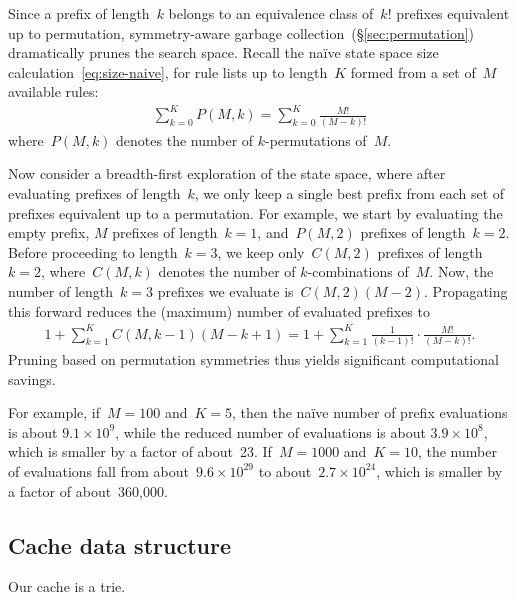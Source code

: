 Since a prefix of length~$k$ belongs to an equivalence class of~$k!$ prefixes
equivalent up to permutation, symmetry-aware garbage collection~(\S\ref{sec:permutation})
dramatically prunes the search space.
%
Recall the na\"ive state space size calculation~\eqref{eq:size-naive},
for rule lists up to length~$K$ formed from a set of~$M$ available rules:
\begin{align}
\sum_{k=0}^K P(M, k) = \sum_{k=0}^K \frac{M!}{(M - k)!}
\end{align}
where~${P(M, k)}$ denotes the number of $k$-permutations of~$M$.

Now consider a breadth-first exploration of the state space,
where after evaluating prefixes of length~$k$, we only keep a single best prefix
from each set of prefixes equivalent up to a permutation.
%
For example, we start by evaluating the empty prefix,
$M$ prefixes of length~${k=1}$, and~${P(M, 2)}$ prefixes of length~${k=2}$.
%
Before proceeding to length~${k=3}$, we keep only~${C(M, 2)}$ prefixes of length~${k=2}$,
where~${C(M, k)}$ denotes the number of $k$-combinations of~$M$.
%
Now, the number of length~${k=3}$ prefixes we evaluate is~${C(M, 2) (M - 2)}$.
%
Propagating this forward reduces the (maximum) number of evaluated prefixes to
\begin{align}
1 + \sum_{k=1}^K C(M, k-1) (M - k + 1)
= 1 + \sum_{k=1}^K \frac{1}{(k - 1)!} \cdot \frac{M!}{(M - k)!}.
\end{align}
Pruning based on permutation symmetries thus yields significant computational savings.

For example, if~${M = 100}$ and~${K = 5}$, then the na\"ive number of prefix evaluations is
about ${9.1 \times 10^9}$, while the reduced number of evaluations is about ${3.9 \times 10^8}$,
which is smaller by a factor of about~23.
%
If~${M=1000}$ and~${K = 10}$, the number of evaluations fall from
about~${9.6 \times 10^{29}}$ to about~${2.7 \times 10^{24}}$,
which is smaller by a factor of about~360,000.
%

\subsection{Cache data structure}
\label{sec:cache}

Our cache is a trie.

